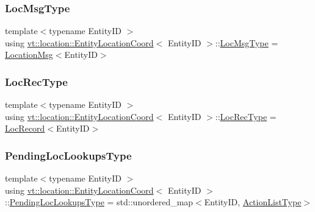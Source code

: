 \subsubsection{\texorpdfstring{Loc\+Msg\+Type}{LocMsgType}}
{\footnotesize\ttfamily template$<$typename Entity\+ID $>$ \\
using \hyperlink{structvt_1_1location_1_1_entity_location_coord}{vt\+::location\+::\+Entity\+Location\+Coord}$<$ Entity\+ID $>$\+::\hyperlink{structvt_1_1location_1_1_entity_location_coord_a8799cbd5fb0fb04cfdd1012fe1d5908f}{Loc\+Msg\+Type} =  \hyperlink{structvt_1_1location_1_1_location_msg}{Location\+Msg}$<$Entity\+ID$>$}

\mbox{\label{structvt_1_1location_1_1_entity_location_coord_a685f9eee868b7b9e01072a5b303548bc}} 
\subsubsection{\texorpdfstring{Loc\+Rec\+Type}{LocRecType}}
{\footnotesize\ttfamily template$<$typename Entity\+ID $>$ \\
using \hyperlink{structvt_1_1location_1_1_entity_location_coord}{vt\+::location\+::\+Entity\+Location\+Coord}$<$ Entity\+ID $>$\+::\hyperlink{structvt_1_1location_1_1_entity_location_coord_a685f9eee868b7b9e01072a5b303548bc}{Loc\+Rec\+Type} =  \hyperlink{structvt_1_1location_1_1_loc_record}{Loc\+Record}$<$Entity\+ID$>$}

\mbox{\label{structvt_1_1location_1_1_entity_location_coord_a495c5dfc3aa444524af9aede4b20cfdc}} 
\subsubsection{\texorpdfstring{Pending\+Loc\+Lookups\+Type}{PendingLocLookupsType}}
{\footnotesize\ttfamily template$<$typename Entity\+ID $>$ \\
using \hyperlink{structvt_1_1location_1_1_entity_location_coord}{vt\+::location\+::\+Entity\+Location\+Coord}$<$ Entity\+ID $>$\+::\hyperlink{structvt_1_1location_1_1_entity_location_coord_a495c5dfc3aa444524af9aede4b20cfdc}{Pending\+Loc\+Lookups\+Type} =  std\+::unordered\+\_\+map$<$Entity\+ID, \hyperlink{structvt_1_1location_1_1_entity_location_coord_a093712fbaa7584cb35db2b33514a719a}{Action\+List\+Type}$>$}

